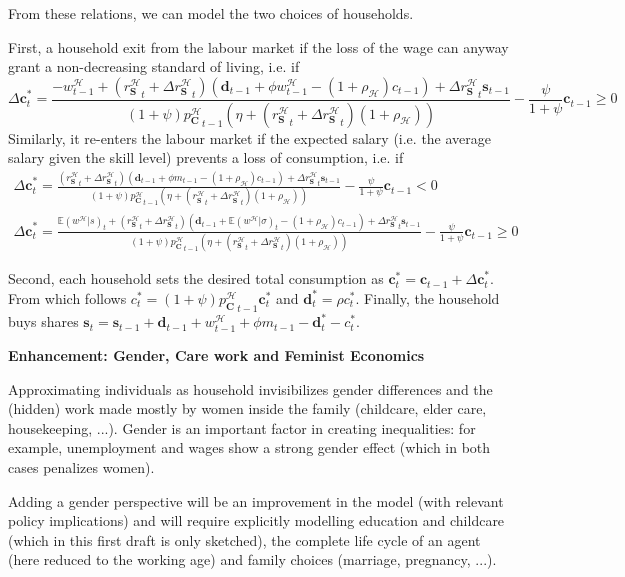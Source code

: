 \documentclass[a4paper, headings=standardclasses]{scrartcl}
\newenvironment{enh}[1][]{\begin{framed}\noindent\textbf{Enhancement: #1}\par}{\end{framed}}
\begin{document}
From these relations, we can model the two choices of households.

First, a household exit from the labour market if the loss of the wage can anyway grant a non-decreasing standard of living, i.e. if
$$ {\Delta \mathbf{c}}^*_t = \frac{-w^{\mathcal{H}}_{t-1} + ({r^{\mathcal{H}}_\mathbf{S}}_t + {\Delta r^{\mathcal{H}}_\mathbf{S}}_{t})(\mathbf{d}_{t-1} + \phi w^{\mathcal{H}}_{t-1} - (1+\rho_{\mathcal{H}}) c_{t-1}) + {\Delta r^{\mathcal{H}}_\mathbf{S}}_{t} \mathbf{s}_{t-1}}{(1+\psi){p^{\mathcal{H}}_\mathbf{C}}_{t-1}(\eta +  ({r^{\mathcal{H}}_\mathbf{S}}_t + {\Delta r^{\mathcal{H}}_\mathbf{S}}_{t})(1+\rho_{\mathcal{H}}))} - \frac{\psi}{1+\psi}{\mathbf{c}_{t-1}} \ge 0$$
Similarly, it re-enters the labour market if the expected salary (i.e. the average salary given the skill level) prevents a loss of consumption, i.e. if
\begin{multline*}
    {\Delta \mathbf{c}}^*_t = \frac{({r^{\mathcal{H}}_\mathbf{S}}_t + {\Delta r^{\mathcal{H}}_\mathbf{S}}_{t})(\mathbf{d}_{t-1} + \phi m_{t-1} - (1+\rho_{\mathcal{H}}) c_{t-1}) + {\Delta r^{\mathcal{H}}_\mathbf{S}}_{t} \mathbf{s}_{t-1}}{(1+\psi){p^{\mathcal{H}}_\mathbf{C}}_{t-1}(\eta +  ({r^{\mathcal{H}}_\mathbf{S}}_t + {\Delta r^{\mathcal{H}}_\mathbf{S}}_{t})(1+\rho_{\mathcal{H}}))} - \frac{\psi}{1+\psi}{\mathbf{c}_{t-1}} < 0 \\
    {\Delta \mathbf{c}}^*_t = \frac{{\mathbb{E}(w^{\mathcal{H}}|s)}_{t} + ({r^{\mathcal{H}}_\mathbf{S}}_t + {\Delta r^{\mathcal{H}}_\mathbf{S}}_{t})(\mathbf{d}_{t-1} + {\mathbb{E}(w^{\mathcal{H}}|\sigma)}_{t} - (1+\rho_{\mathcal{H}}) c_{t-1}) + {\Delta r^{\mathcal{H}}_\mathbf{S}}_{t} \mathbf{s}_{t-1}}{(1+\psi){p^{\mathcal{H}}_\mathbf{C}}_{t-1}(\eta +  ({r^{\mathcal{H}}_\mathbf{S}}_t + {\Delta r^{\mathcal{H}}_\mathbf{S}}_{t})(1+\rho_{\mathcal{H}}))} - \frac{\psi}{1+\psi}{\mathbf{c}_{t-1}} \ge 0
\end{multline*}

Second, each household sets the desired total consumption as $\mathbf{c}^*_t = \mathbf{c}_{t-1} + {\Delta \mathbf{c}}^*_t$. From which follows $c^*_t = (1+\psi) {p^{\mathcal{H}}_\mathbf{C}}_{t-1} \mathbf{c}^*_t$ and $\mathbf{d}^*_t = \rho c^*_t$. Finally, the household buys shares $\mathbf{s}_t = \mathbf{s}_{t-1} + \mathbf{d}_{t-1} + w^{\mathcal{H}}_{t-1} + \phi m_{t-1} - \mathbf{d}^*_t - c^*_t$.

\begin{enh}[Gender, Care work and Feminist Economics]
    Approximating individuals as household invisibilizes gender differences and the (hidden) work made mostly by women inside the family (childcare, elder care, housekeeping, ...).
    Gender is an important factor in creating inequalities: for example, unemployment and wages show a strong gender effect (which in both cases penalizes women).

    Adding a gender perspective will be an improvement in the model (with relevant policy implications) and will require explicitly modelling education and childcare (which in this first draft is only sketched), the complete life cycle of an agent (here reduced to the working age) and family choices (marriage, pregnancy, ...).
\end{enh}
\end{document}
